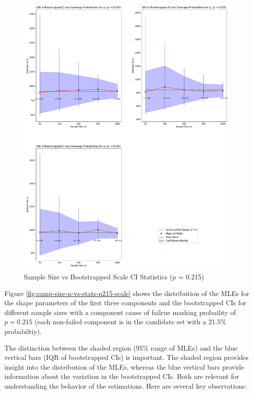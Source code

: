 \documentclass[
]{article}
\begin{document}
\begin{figure}

{\centering \includegraphics{image/plot-n-vs-stats-p215-scale} 

}

\caption{Sample Size vs Bootstrapped Scale CI Statistics (p = 0.215)}\label{fig:samp-size-n-vs-stats-215-scale}
\end{figure}

Figure \ref{fig:samp-size-n-vs-stats-p215-scale} shows the distribution
of the MLEs for the shape parameters of the first three components and
the bootstrapped CIs for different sample sizes with a component cause
of failrue masking probaility of \(p = 0.215\) (each non-failed
component is in the candidate set with a \(21.5\%\) probabiltiy).

The distinction between the shaded region (95\% range of MLEs) and the
blue vertical bars (IQR of bootstrapped CIs) is important. The shaded
region provides insight into the distribution of the MLEs, whereas the
blue vertical bars provide information about the variation in the
bootstrapped CIs. Both are relevant for understanding the behavior of
the estimations. Here are several key observations:
\end{document}

